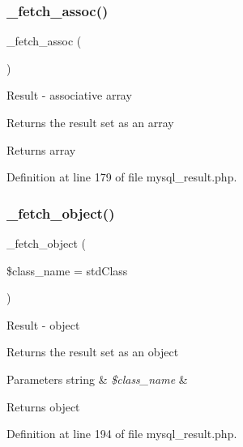 \subsubsection{\texorpdfstring{\_fetch\_assoc()}{\_fetch\_assoc()}}
{\footnotesize\ttfamily \+\_\+fetch\+\_\+assoc (\begin{DoxyParamCaption}{ }\end{DoxyParamCaption})\hspace{0.3cm}{\ttfamily [protected]}}

Result -\/ associative array

Returns the result set as an array

\begin{DoxyReturn}{Returns}
array 
\end{DoxyReturn}


Definition at line 179 of file mysql\+\_\+result.\+php.

\mbox{\label{class_c_i___d_b__mysql__result_a60806be6a9c2488820813c2a7f4fef71}} 
\subsubsection{\texorpdfstring{\_fetch\_object()}{\_fetch\_object()}}
{\footnotesize\ttfamily \+\_\+fetch\+\_\+object (\begin{DoxyParamCaption}\item[{}]{\$class\+\_\+name = {\ttfamily \textquotesingle{}stdClass\textquotesingle{}} }\end{DoxyParamCaption})\hspace{0.3cm}{\ttfamily [protected]}}

Result -\/ object

Returns the result set as an object


\begin{DoxyParams}[1]{Parameters}
string & {\em \$class\+\_\+name} & \\
\hline
\end{DoxyParams}
\begin{DoxyReturn}{Returns}
object 
\end{DoxyReturn}


Definition at line 194 of file mysql\+\_\+result.\+php.

\mbox{\label{class_c_i___d_b__mysql__result_a8255ae91816e4206e29eb7581c5af0f1}} 
